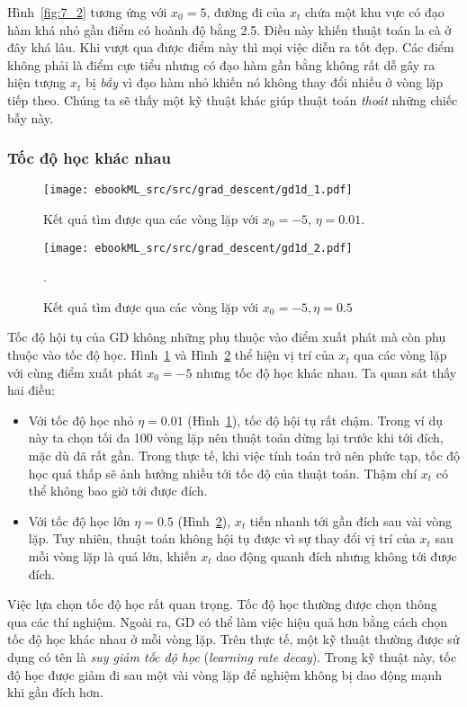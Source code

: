 Hình~\ref{fig:7_2} tương ứng với $x_{0} = 5 $, {đường đi} của $x_t$ chứa một
khu vực có đạo hàm khá nhỏ gần điểm có hoành độ bằng 2.5. Điều này khiến thuật
toán {la cà} ở đây khá lâu. Khi vượt qua được điểm này thì mọi việc diễn ra tốt
đẹp. Các điểm không phải là điểm cực tiểu nhưng có đạo hàm gần bằng không rất dễ
gây ra hiện tượng $x_t$ bị \textit{bẫy} vì đạo hàm nhỏ khiến nó không thay đổi
nhiều ở vòng lặp tiếp theo. Chúng ta sẽ thấy một kỹ thuật khác giúp thuật toán
\textit{thoát} những chiếc bẫy này.
 
\subsubsection{Tốc độ học khác nhau}


\begin{figure}[t]
\centering
    \texttt{[image: ebookML\_src/src/grad\_descent/gd1d\_1.pdf]}
    \caption[]{Kết quả tìm được qua các vòng lặp với $x_0 = -5$, $\eta = 0.01$.}
    \label{fig:7_3}
\end{figure}

\begin{figure}[t]
\centering
    \texttt{[image: ebookML\_src/src/grad\_descent/gd1d\_2.pdf]}
    \caption[]{Kết quả tìm được qua các vòng lặp với $x_0 = -5, \eta = 0.5$}.
    \label{fig:7_4}
\end{figure}



Tốc độ hội tụ của GD không những phụ thuộc vào điểm xuất phát mà còn phụ
thuộc vào tốc độ học. Hình~\ref{fig:7_3} và Hình~\ref{fig:7_4} thể
hiện vị trí của $x_t$ qua các vòng lặp với cùng điểm xuất phát $x_{0} = -5$
nhưng tốc độ học khác nhau. Ta quan sát thấy hai điều: 
\begin{itemize}
    \item Với tốc độ học nhỏ $\eta = 0.01$ (Hình~\ref{fig:7_3}), tốc độ
    hội tụ rất chậm. Trong ví dụ này ta chọn tối đa 100 vòng lặp nên thuật toán
    dừng lại trước khi tới {đích}, mặc dù đã rất gần. Trong thực tế, khi việc
    tính toán trở nên phức tạp, tốc độ học quá thấp sẽ ảnh hưởng nhiều tới tốc
    độ của thuật toán. Thậm chí $x_t$ có thể không bao giờ tới được đích.

    \item Với tốc độ học lớn $\eta = 0.5$ (Hình~\ref{fig:7_4}),
    $x_t$ tiến nhanh tới {gần đích} sau vài vòng lặp. Tuy nhiên,
    thuật toán không hội tụ được vì sự thay đổi vị trí của $x_t$ sau mỗi vòng
    lặp là quá lớn, khiến $x_t$ dao động quanh đích nhưng không tới được đích. 

\end{itemize}
Việc lựa chọn tốc độ học rất quan trọng. Tốc độ học thường được chọn thông qua
các thí nghiệm. Ngoài ra, GD có thể làm việc hiệu quả hơn bằng cách chọn tốc độ
học khác nhau ở mỗi vòng lặp. Trên thực tế, một kỹ thuật thường được sử dụng có
tên là \textit{suy giảm tốc độ học} (\textit{learning rate decay}). Trong kỹ
thuật này, tốc độ học được giảm đi sau một vài vòng lặp để nghiệm không bị dao
động mạnh khi gần đích hơn.
 
